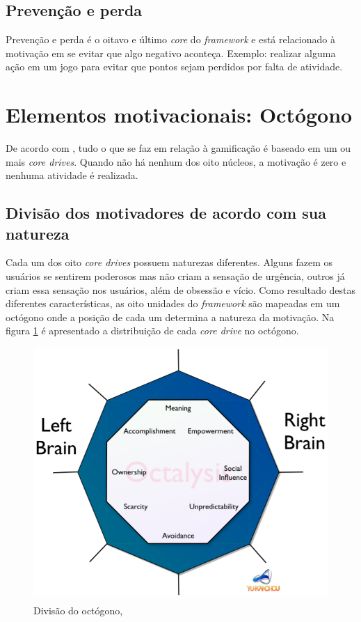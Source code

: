 \subsection{Prevenção e perda}
Prevenção e perda é o oitavo e último \textit{core} do \textit{framework} e está relacionado à motivação em se evitar que algo negativo
aconteça. Exemplo: realizar alguma ação em um jogo para evitar que pontos sejam perdidos por falta de atividade.

\section{Elementos motivacionais: Octógono}
De acordo com , tudo o que se faz em relação à gamificação é baseado em um ou mais \textit{core drives}. 
Quando não há nenhum dos oito núcleos, a motivação é zero e nenhuma atividade é realizada.

\subsection{Divisão dos motivadores de acordo com sua natureza}

Cada um dos oito \textit{core drives} possuem naturezas diferentes. Alguns fazem os usuários se sentirem poderosos mas não criam a 
sensação de urgência, outros já criam essa sensação nos usuários, além de obsessão e vício. Como resultado destas diferentes características,
as oito unidades do \textit{framework} são mapeadas em um octógono onde a posição de cada um determina a natureza da motivação. Na figura \ref{octogono}
é apresentado a distribuição de cada \textit{core drive} no octógono.

\begin{figure}[h]
	\centering
	\includegraphics[keepaspectratio=true,scale=0.34]{figuras/brain.png}
	\caption{Divisão do octógono, }
	\label{octogono}
\end{figure}


